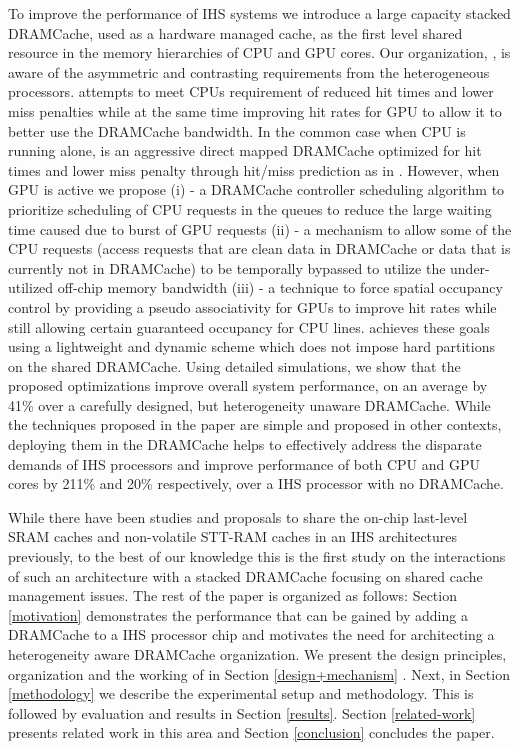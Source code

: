 To improve the performance of IHS systems we introduce a large capacity stacked DRAMCache, used as a hardware managed cache, as the first level shared resource in the memory hierarchies of CPU and GPU cores. Our organization, \cachename, is aware of the asymmetric and contrasting requirements from the heterogeneous processors. \cachename attempts to meet CPUs requirement of reduced hit times and lower miss penalties while at the same time improving hit rates for GPU to allow it to better use the DRAMCache bandwidth. In the common case when CPU is running alone, \cachename is an aggressive direct mapped DRAMCache optimized for hit times and lower miss penalty through hit/miss prediction as in \cite{alloy}. However, when GPU is active we propose (i) \prioname - a DRAMCache controller scheduling algorithm to prioritize scheduling of CPU requests in the queues to reduce the large waiting time caused due to burst of GPU requests (ii) \bypassname - a mechanism to allow some of the CPU requests (access requests that are clean data in DRAMCache or data that is currently not in DRAMCache) to be temporally bypassed to utilize the under-utilized off-chip memory bandwidth
(iii) \chaining - a technique to force spatial occupancy control by providing a pseudo associativity for GPUs to improve hit rates while still allowing certain guaranteed occupancy for CPU lines. \cachename achieves these goals using a lightweight and dynamic scheme which does not impose hard partitions on the shared DRAMCache. Using detailed simulations, we show that the proposed optimizations improve overall system performance, on an average by 41\% over a carefully designed, but heterogeneity unaware DRAMCache.
While the techniques proposed in the paper are simple and proposed in other contexts, deploying them in the DRAMCache helps to effectively address the disparate demands of IHS processors and improve performance of both CPU and GPU cores by 211\% and 20\% respectively, over a IHS processor with no DRAMCache.

\par While there have been studies and proposals to share the on-chip last-level SRAM caches \cite{helm,tap} and non-volatile STT-RAM caches \cite{oscar} in an IHS architectures previously, to the best of our knowledge this is the first study on the interactions of such an architecture with a stacked DRAMCache focusing on shared cache management issues.
The rest of the paper is organized as follows: Section \ref{motivation} demonstrates the performance that can be gained by adding a DRAMCache to a IHS processor chip and motivates the need for architecting a heterogeneity aware DRAMCache organization. We present the design principles, organization and the working of \cachename in Section \ref{design+mechanism} . Next, in Section \ref{methodology} we describe the experimental setup and methodology. This is followed by evaluation and results in Section \ref{results}. Section \ref{related-work} presents related work in this area and Section \ref{conclusion} concludes the paper.
